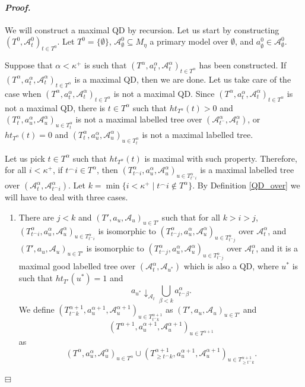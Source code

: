\documentclass[12pt,a4paper]{amsart}
\theoremstyle{definition}
\theoremstyle{remark}
\renewcommand{\mid}{\mathrel{|}\allowbreak}
\newenvironment{cproof}{\paragraph{\emph{Proof.\,}}}{\hfill{$\boxminus$}\par\vspace{2mm}}
\begin{document}
\begin{cproof}
    We will construct a maximal QD by recursion. Let us start by constructing $(T^0, \mathcal{A}_t^0)_{t\in T^0}$. Let $T^0=\{\emptyset\}$, $\mathcal{A}_\emptyset^0\subseteq M_\eta$ a primary model over $\emptyset$, and $a_\emptyset^0\in \mathcal{A}_\emptyset^0$. %
    
    Suppose that $\alpha<\kappa^+$ is such that $(T^\alpha, a_t^\alpha, \mathcal{A}_t^\alpha)_{t\in T^\alpha}$ has been constructed. If $(T^\alpha, a_t^\alpha, \mathcal{A}_t^\alpha)_{t\in T^\alpha}$ is a maximal QD, then we are done. 
    Let us take care of the case when $(T^\alpha, a_t^\alpha, \mathcal{A}_t^\alpha)_{t\in T^\alpha}$ is not a maximal QD. 
    Since $(T^\alpha, a_t^\alpha, \mathcal{A}_t^\alpha)_{t\in T^\alpha}$ is not a maximal QD, there is $t\in T^\alpha$ such that $ht_{T^\alpha}(t)>0$ and $(T^\alpha_{t}, a_u^\alpha, \mathcal{A}_u^\alpha)_{u\in T^\alpha_{t}}$ is not a maximal labelled tree over $(\mathcal{A}^\alpha_{t^-},\mathcal{A}^\alpha_t)$, or $ht_{T^\alpha}(t)=0$ and $(T^\alpha_{t}, a_u^\alpha, \mathcal{A}_u^\alpha)_{u\in T^\alpha_{t}}$ is not a maximal labelled tree.
    
    Let us pick $t\in T^\alpha$ such that $ht_{T^\alpha}(t)$ is maximal with such property. Therefore, for all $i<\kappa^+$, if $t^\frown i\in T^\alpha$, then $(T^\alpha_{t^\frown i}, a_u^\alpha, \mathcal{A}_u^\alpha)_{u\in T^\alpha_{t^\frown i}}$ is a maximal labelled tree over $(\mathcal{A}^\alpha_{t},\mathcal{A}^\alpha_{t^\frown i})$. Let $k= \min \{i<\kappa^+\mid t^\frown i\notin T^\alpha\}$. By Definition \ref{QD_over} we will have to deal with three cases.
    \begin{enumerate}
        \item There are $j<k$ and $(T', a_u, \mathcal{A}_u)_{u\in T'}$ such that for all $k>i>j$, $(T^\alpha_{t^\frown i}, a_u^\alpha, \mathcal{A}_u^\alpha)_{u\in T^\alpha_{t^\frown i}}$ is isomorphic to $(T^\alpha_{t^\frown j}, a_u^\alpha, \mathcal{A}_u^\alpha)_{u\in T^\alpha_{t^\frown j}}$  over $\mathcal{A}^\alpha_t$, and $(T', a_u, \mathcal{A}_u)_{u\in T'}$ is isomorphic to $(T^\alpha_{t^\frown j}, a_u^\alpha, \mathcal{A}_u^\alpha)_{u\in T^\alpha_{t^\frown j}}$  over $\mathcal{A}^\alpha_t$, and it is a maximal good labelled tree over $(\mathcal{A}^\alpha_t, \mathcal{A}_{u^*})$ which is also a QD, where $u^*$ is such that $ht_{T'}(u^*)=1$ and $$a_{u^*}\downarrow_{\mathcal{A}_t}\bigcup_{\beta<k}a^\alpha_{t^\frown \beta}.$$ 
        We define $(T^{\alpha+1}_{t^\frown k}, a_u^{\alpha+1}, \mathcal{A}_u^{\alpha+1})_{u\in T^{\alpha+1}_{t^\frown k}}$ as $(T', a_u, \mathcal{A}_u)_{u\in T'}$ and $$(T^{\alpha+1}, a_u^{\alpha+1}, \mathcal{A}_u^{\alpha+1})_{u\in T^{\alpha+1}}$$ as $$(T^\alpha, a_u^\alpha, \mathcal{A}_u^\alpha)_{u\in T^\alpha}\cup (T^{\alpha+1}_{\ge t^\frown k}, a_u^{\alpha+1}, \mathcal{A}_u^{\alpha+1})_{u\in T^{\alpha+1}_{\ge t^\frown k}}.$$
        

\end{enumerate}
\end{cproof}
\end{document}
